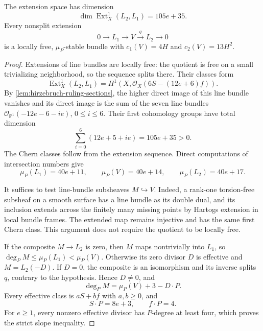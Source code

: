 \begin{proposition}\label{prop:hirzebruch-stable-extensions}
The extension space has dimension
\[
 \dim\operatorname{Ext}^1_X(L_2,L_1)=105e+35.
\]
Every nonsplit extension
\[
 0\longrightarrow L_1\longrightarrow V\xrightarrow{q}L_2
 \longrightarrow0
\]
is a locally free, $\mu_P$-stable bundle with $c_1(V)=4H$ and $c_2(V)=13H^2$.
\end{proposition}
\begin{proof}
Extensions of line bundles are locally free: the quotient is free on a small trivializing neighborhood, so the sequence splits there. Their classes form
\[
 \operatorname{Ext}^1_X(L_2,L_1)
 =H^1(X,\mathcal O_X(6S-(12e+6)f)).
\]
By \cref{lem:hirzebruch-ruling-sections}, the higher direct image of this line bundle vanishes and its direct image is the sum of the seven line bundles $\mathcal O_{\mathbb P^1}(-12e-6-ie)$, $0\leq i\leq6$. Their first cohomology groups have total dimension
\[
 \sum_{i=0}^6(12e+5+ie)=105e+35>0.
\]
The Chern classes follow from the extension sequence. Direct computations of intersection numbers give
\[
 \mu_P(L_1)=40e+11,\qquad \mu_P(V)=40e+14,
 \qquad \mu_P(L_2)=40e+17.
\]

It suffices to test line-bundle subsheaves $M\hookrightarrow V$. Indeed, a rank-one torsion-free subsheaf on a smooth surface has a line bundle as its double dual, and its inclusion extends across the finitely many missing points by Hartogs extension in local bundle frames. The extended map remains injective and has the same first Chern class. This argument does not require the quotient to be locally free.

If the composite $M\to L_2$ is zero, then $M$ maps nontrivially into $L_1$, so $\deg_P M\leq\mu_P(L_1)<\mu_P(V)$. Otherwise its zero divisor $D$ is effective and $M=L_2(-D)$. If $D=0$, the composite is an isomorphism and its inverse splits $q$, contrary to the hypothesis. Hence $D\neq0$, and
\[
 \deg_P M=\mu_P(V)+3-D\cdot P.
\]
Every effective class is $aS+bf$ with $a,b\geq0$, and
\[
 S\cdot P=8e+3,\qquad f\cdot P=4.
\]
For $e\geq1$, every nonzero effective divisor has $P$-degree at least four, which proves the strict slope inequality.


\end{proof}
